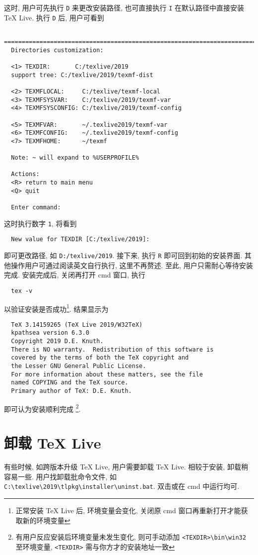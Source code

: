 \documentclass{ctexrep}
\begin{document}
这时, 用户可先执行 \texttt{D} 来更改安装路径, 也可直接执行 \texttt{I} 在默认路径中直接安装 \TeX{} Live. 
执行 \texttt{D} 后, 用户可看到
\begin{lstlisting}
  ==============================================================================
  Directories customization:
  
  <1> TEXDIR:       C:/texlive/2019
  support tree: C:/texlive/2019/texmf-dist
  
  <2> TEXMFLOCAL:     C:/texlive/texmf-local
  <3> TEXMFSYSVAR:    C:/texlive/2019/texmf-var
  <4> TEXMFSYSCONFIG: C:/texlive/2019/texmf-config
  
  <5> TEXMFVAR:       ~/.texlive2019/texmf-var
  <6> TEXMFCONFIG:    ~/.texlive2019/texmf-config
  <7> TEXMFHOME:      ~/texmf
  
  Note: ~ will expand to %USERPROFILE%
  
  Actions:
  <R> return to main menu
  <Q> quit
  
  Enter command:
\end{lstlisting}
这时执行数字 \texttt{1}, 将看到
\begin{lstlisting}
  New value for TEXDIR [C:/texlive/2019]:
\end{lstlisting}
即可更改路径, 如 \texttt{D:/texlive/2019}. 
接下来, 执行 \texttt{R} 即可回到初始的安装界面. 
其他操作用户可通过阅读英文自行执行, 这里不再赘述. 
至此, 用户只需耐心等待安装完成. 
安装完成后, 关闭再打开 \textsf{cmd} 窗口, 执行
\begin{lstlisting}
  tex -v
\end{lstlisting}
以验证安装是否成功\footnote{正常安装 \TeX{} Live 后, 环境变量会变化, 关闭原 \textsf{cmd} 窗口再重新打开才能获取新的环境变量}. 
结果显示为
\begin{lstlisting}
  TeX 3.14159265 (TeX Live 2019/W32TeX)
  kpathsea version 6.3.0
  Copyright 2019 D.E. Knuth.
  There is NO warranty.  Redistribution of this software is
  covered by the terms of both the TeX copyright and
  the Lesser GNU General Public License.
  For more information about these matters, see the file
  named COPYING and the TeX source.
  Primary author of TeX: D.E. Knuth.
\end{lstlisting}
即可认为安装顺利完成 \footnote{有用户反应安装后环境变量未发生变化, 则可手动添加 \texttt{<TEXDIR>\textbackslash bin\textbackslash win32} 至环境变量, \texttt{<TEXDIR>} 需与你方才的安装地址一致}. 

\section{卸载 \TeX{} Live}
有些时候, 如跨版本升级 \TeX{} Live,  用户需要卸载 \TeX{} Live. 
相较于安装, 卸载稍容易一些. 
用户找卸载批命令文件, 如 \texttt{C:\textbackslash texlive\textbackslash 2019\textbackslash tlpkg\textbackslash installer\textbackslash uninst.bat}. 
双击或在 \textsf{cmd} 中运行均可. 
\end{document}

